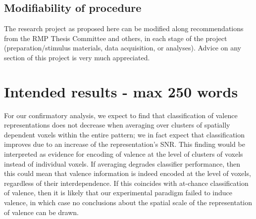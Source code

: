 \documentclass[12pt,a4paper]{article}\usepackage[]{graphicx}\usepackage[]{color}
\begin{document}
\subsection{Modifiability of procedure}
The research project as proposed here can be modified along recommendations from the RMP Thesis Committee and others, in each stage of the project (preparation/stimulus materials, data acquisition, or analyses). Advice on any section of this project is very much appreciated. \\

\noindent
\wordcount

\section{Intended results \textmd{- max 250 words}}

For our confirmatory analysis, we expect to find that classification of valence representations does not decrease when averaging over clusters of spatially dependent voxels within the entire pattern; we in fact expect that classification improves due to an increase of the representation's SNR. This finding would be interpreted as evidence for encoding of valence at the level of clusters of voxels instead of individual voxels. If averaging degrades classifier performance, then this could mean that valence information is indeed encoded at the level of voxels, regardless of their interdependence. If this coincides with at-chance classification of valence, then it is likely that our experimental paradigm failed to induce valence, in which case no conclusions about the spatial scale of the representation of valence can be drawn.  
\end{document}
